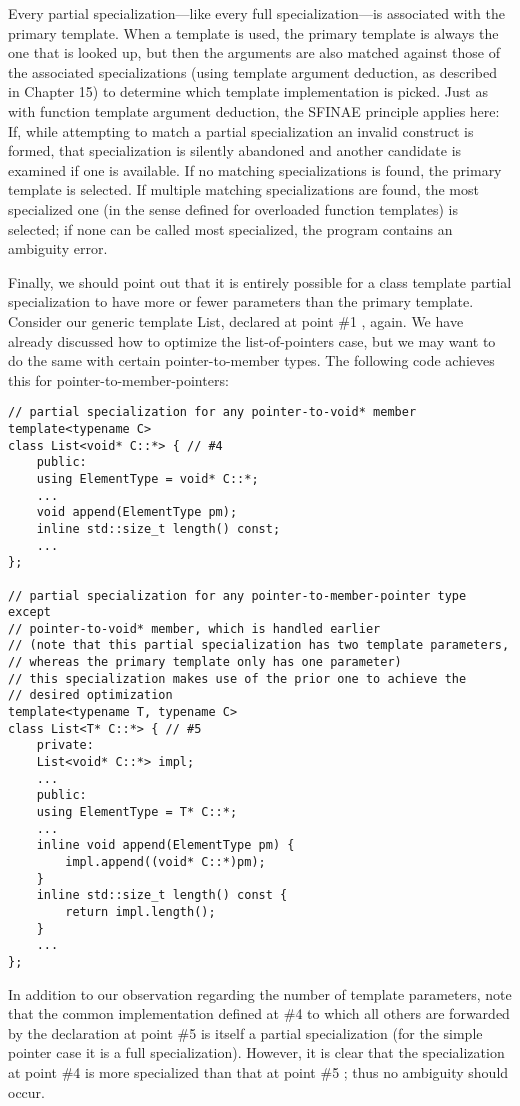 Every partial specialization—like every full specialization—is associated with the primary template. When a template is used, the primary template is always the one that is looked up, but then the arguments are also matched against those of the associated specializations (using template argument deduction, as described in Chapter 15) to determine which template implementation is picked. Just as with function template argument deduction, the SFINAE principle applies here: If, while attempting to match a partial specialization an invalid construct is formed, that specialization is silently abandoned and another candidate is examined if one is available. If no matching specializations is found, the primary template is selected. If multiple matching specializations are found, the most specialized one (in the sense defined for overloaded function templates) is selected; if none can be called most specialized, the program contains an ambiguity error.

Finally, we should point out that it is entirely possible for a class template partial specialization to have more or fewer parameters than the primary template. Consider our generic template List, declared at point \#1 , again. We have already discussed how to optimize the list-of-pointers case, but we may want to do the same with certain pointer-to-member types. The following code achieves this for pointer-to-member-pointers:

\begin{lstlisting}[style=styleCXX]
// partial specialization for any pointer-to-void* member
template<typename C>
class List<void* C::*> { // #4
	public:
	using ElementType = void* C::*;
	...
	void append(ElementType pm);
	inline std::size_t length() const;
	...
};

// partial specialization for any pointer-to-member-pointer type except
// pointer-to-void* member, which is handled earlier
// (note that this partial specialization has two template parameters,
// whereas the primary template only has one parameter)
// this specialization makes use of the prior one to achieve the
// desired optimization
template<typename T, typename C>
class List<T* C::*> { // #5
	private:
	List<void* C::*> impl;
	...
	public:
	using ElementType = T* C::*;
	...
	inline void append(ElementType pm) {
		impl.append((void* C::*)pm);
	}
	inline std::size_t length() const {
		return impl.length();
	}
	...
};
\end{lstlisting}

In addition to our observation regarding the number of template parameters, note that the common implementation defined at \#4 to which all others are forwarded by the declaration at point \#5 is itself a partial specialization (for the simple pointer case it is a full specialization). However, it is clear that the specialization at point \#4 is more specialized than that at point \#5 ; thus no ambiguity should occur.


